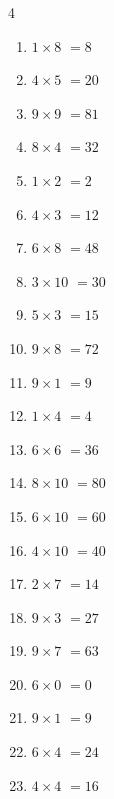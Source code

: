 \begin{multicols}{4}
\begin{enumerate}
  \item $1\times 8$
        $=8$

  \item $4\times 5$
        $=20$

  \item $9\times 9$
        $=81$

  \item $8\times 4$
        $=32$

  \item $1\times 2$
        $=2$

  \item $4\times 3$
        $=12$

  \item $6\times 8$
        $=48$

  \item $3\times 10$
        $=30$

  \item $5\times 3$
        $=15$

  \item $9\times 8$
        $=72$

  \item $9\times 1$
        $=9$

  \item $1\times 4$
        $=4$

  \item $6\times 6$
        $=36$

  \item $8\times 10$
        $=80$

  \item $6\times 10$
        $=60$

  \item $4\times 10$
        $=40$

  \item $2\times 7$
        $=14$

  \item $9\times 3$
        $=27$

  \item $9\times 7$
        $=63$

  \item $6\times 0$
        $=0$

  \item $9\times 1$
        $=9$

\columnbreak %

  \item $6\times 4$
        $=24$

  \item $4\times 4$
        $=16$


\end{enumerate}
\end{multicols}
